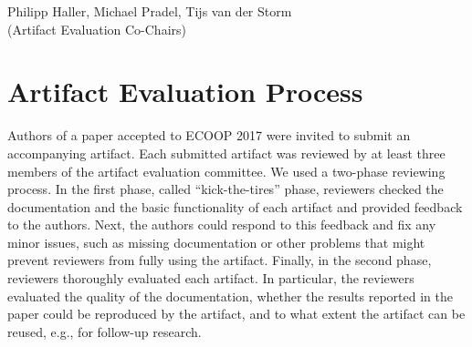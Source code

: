 \documentclass[a4paper,UKenglish]{dartsmaster}
\begin{document}
\vspace{1em}
\noindent
Philipp Haller, Michael Pradel, Tijs van der Storm\\
(Artifact Evaluation Co-Chairs)


\chapter{Artifact Evaluation Process}

Authors of a paper accepted to ECOOP 2017 were invited to submit an 
accompanying artifact. Each submitted artifact was reviewed by at least 
three members of the artifact evaluation committee. We used a two-phase 
reviewing process. In the first phase, called ``kick-the-tires'' phase, 
reviewers checked the documentation and the basic functionality of each 
artifact and provided feedback to the authors. Next, the authors could 
respond to this feedback and fix any minor issues, such as missing 
documentation or other problems that might prevent reviewers from fully 
using the artifact. Finally, in the second phase, reviewers thoroughly 
evaluated each artifact. In particular, the reviewers evaluated the quality 
of the documentation, whether the results reported in the paper could be 
reproduced by the artifact, and to what extent the artifact can be reused, 
e.g., for follow-up research.
\end{document}
